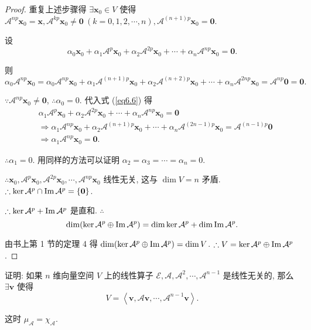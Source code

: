 \documentclass[color=black,device=normal,lang=cn,mode=geye]{elegantnote}
\begin{document}
\begin{proof}
    重复上述步骤得 $\exists\boldsymbol{x}_0\in V$ 使得 $\mathcal{A}^{np}\boldsymbol{x}_0=\boldsymbol{x},\mathcal{A}^{kp}\boldsymbol{x}_0\neq\boldsymbol{0}\ (k=0,1,2,\cdots,n),\mathcal{A}^{(n+1)p}\boldsymbol{x}_0=\boldsymbol{0}$.

    设
    \begin{equation}\label{eq6.6}
        \alpha_0\boldsymbol{x}_0+\alpha_1\mathcal{A}^p\boldsymbol{x}_0+\alpha_2\mathcal{A}^{2p}\boldsymbol{x}_0+\cdots+\alpha_n\mathcal{A}^{np}\boldsymbol{x}_0=\boldsymbol{0}.
    \end{equation}

    则
    \[\alpha_0\mathcal{A}^{np}\boldsymbol{x}_0=\alpha_0\mathcal{A}^{np}\boldsymbol{x}_0+\alpha_1\mathcal{A}^{(n+1)p}\boldsymbol{x}_0+\alpha_2\mathcal{A}^{(n+2)p}\boldsymbol{x}_0+\cdots+\alpha_n\mathcal{A}^{2np}\boldsymbol{x}_0=\mathcal{A}^{np}\boldsymbol{0}=\boldsymbol{0}.\]

    $\because\mathcal{A}^{np}\boldsymbol{x}_0\neq\boldsymbol{0}$, $\therefore\alpha_0=0$. 代入式 (\ref{eq6.6}) 得
    \begin{align*}
        & \alpha_1\mathcal{A}^p\boldsymbol{x}_0+\alpha_2\mathcal{A}^{2p}\boldsymbol{x}_0+\cdots+\alpha_n\mathcal{A}^{np}\boldsymbol{x}_0=\boldsymbol{0} \\
        & \Rightarrow\alpha_1\mathcal{A}^{np}\boldsymbol{x}_0+\alpha_2\mathcal{A}^{(n+1)p}\boldsymbol{x}_0+\cdots+\alpha_n\mathcal{A}^{(2n-1)p}\boldsymbol{x}_0=\mathcal{A}^{(n-1)p}\boldsymbol{0} \\
        & \Rightarrow\alpha_1\mathcal{A}^{np}\boldsymbol{x}_0=\boldsymbol{0}.
    \end{align*}

    $\therefore\alpha_1=0$. 用同样的方法可以证明 $\alpha_2=\alpha_3=\cdots=\alpha_n=0$.
    
    $\therefore\boldsymbol{x}_0,\mathcal{A}^p\boldsymbol{x}_0,\mathcal{A}^{2p}\boldsymbol{x}_0,\cdots,\mathcal{A}^{np}\boldsymbol{x}_0$ 线性无关, 这与 $\dim V=n$ 矛盾. $\therefore\ker\mathcal{A}^p\cap\operatorname{Im} \mathcal{A}^p=\{\boldsymbol{0}\}$.

    $\therefore\ker\mathcal{A}^p+\operatorname{Im}\mathcal{A}^p$ 是直和. $\therefore$
    \[\dim(\ker\mathcal{A}^p\oplus\operatorname{Im}\mathcal{A}^p)=\dim\ker\mathcal{A}^p+\dim\operatorname{Im} \mathcal{A}^p.\]

    由书上第 1 节的定理 4 得 $\dim(\ker\mathcal{A}^p\oplus\operatorname{Im} \mathcal{A}^p)=\dim V$. $\therefore V=\ker\mathcal{A}^p\oplus\operatorname{Im} \mathcal{A}^p$.
\end{proof}
\begin{exercise}[按照 2.3.15 修改]
    证明: 如果 $n$ 维向量空间 $V$ 上的线性算子 $\mathcal{E},\mathcal{A},\mathcal{A}^2,\cdots,\mathcal{A}^{n-1}$ 是线性无关的, 那么 $\exists\boldsymbol{v}$ 使得
    \[V=\left<\boldsymbol{v},\mathcal{A}\boldsymbol{v},\cdots,\mathcal{A}^{n-1}\boldsymbol{v}\right>.\]

    这时 $\mu_{\mathcal{A}}=\chi_{\mathcal{A}}$.
\end{exercise}
\end{document}

